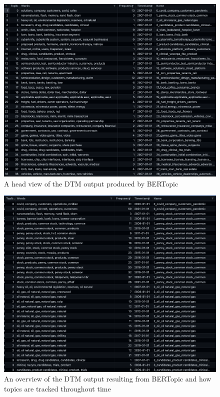 \documentclass[12pt,MSc,a4paper,oneside]{muthesis}
\begin{document}
\label{appendix:11}
\begin{figure}[h]
    \centering
    \includegraphics[scale=0.35]{images/DTM head.png}
    \caption{A head view of the DTM output produced by BERTopic}
\end{figure}

\label{appendix:12}
\begin{figure}[h]
    \centering
    \includegraphics[scale=0.3]{images/DTM Output Example.png}
    \caption{An overview of the DTM output resulting from BERTopic and how topics are tracked throughout time}
\end{figure}
\end{document}
